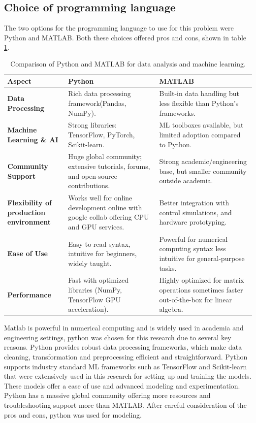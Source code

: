 \subsection{Choice of programming language}
The two options for the programming language to use for this problem were Python and MATLAB. Both these choices offered pros and cons, shown in table \ref{tab:python_matlab_comparison}.
\begin{table}[h!]
	\centering
	\renewcommand{\arraystretch}{1.8} %
	\begin{tabular}{|p{3.5cm}|p{5.5cm}|p{5.5cm}|}
		\hline
		\textbf{Aspect} & \textbf{Python} & \textbf{MATLAB} \\
		\hline
		\textbf{Data Processing} & Rich data processing framework(Pandas, NumPy). & Built-in data handling but less flexible than Python’s frameworks. \\
		\hline
		\textbf{Machine Learning \& AI} & Strong libraries: TensorFlow, PyTorch, Scikit-learn. & ML toolboxes available, but limited adoption compared to Python. \\
		\hline
		\textbf{Community Support} & Huge global community; extensive tutorials, forums, and open-source contributions. & Strong academic/engineering base, but smaller community outside academia. \\
		\hline
		\textbf{Flexibility of production environment} & Works well for online development online with google collab offering CPU and GPU services. & Better integration with control simulations, and hardware prototyping. \\
		\hline
		\textbf{Ease of Use} & Easy-to-read syntax, intuitive for beginners, widely taught. & Powerful for numerical computing syntax less intuitive for general-purpose tasks. \\
		\hline
		\textbf{Performance} & Fast with optimized libraries (NumPy, TensorFlow GPU acceleration). & Highly optimized for matrix operations sometimes faster out-of-the-box for linear algebra. \\
		\hline
	\end{tabular}
	\caption{Comparison of Python and MATLAB for data analysis and machine learning.}
	\label{tab:python_matlab_comparison}
\end{table}

Matlab is powerful in numerical computing and is widely used in academia and engineering settings, python was chosen for this research due to several key reasons. Python provides robust data processing frameworks, which make data cleaning, transformation and preprocessing efficient and straightforward. Python supports industry standard ML frameworks such as TensorFlow and Scikit-learn that were extensively used in this research for setting up and training the models. These models offer a ease of use and advanced modeling and experimentation. Python has a massive global community offering more resources and troubleshooting support more than MATLAB. After careful consideration of the pros and cons, python was used for modeling.


